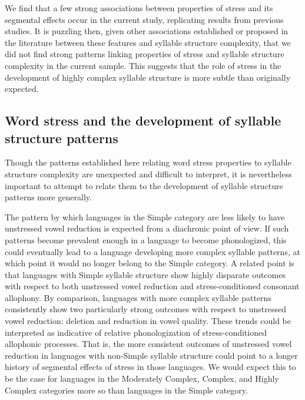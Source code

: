   We find that a few strong associations between properties of stress and its segmental effects occur in the current study, replicating results from previous studies. It is puzzling then, given other associations established or proposed in the literature between these features and syllable structure complexity, that we did not find strong patterns linking properties of stress and syllable structure complexity in the current sample. This suggests that the role of stress in the development of highly complex syllable structure is more subtle than originally expected.

\subsection{Word stress and the development of syllable structure patterns}\label{sec:5.5.2}

  Though the patterns established here relating word stress properties to syllable structure complexity are unexpected and difficult to interpret, it is nevertheless important to attempt to relate them to the development of syllable structure patterns more generally.

  The pattern by which languages in the Simple category are less likely to have unstressed vowel reduction is expected from a diachronic point of view. If such patterns become prevalent enough in a language to become phonologized, this could eventually lead to a language developing more complex syllable patterns, at which point it would no longer belong to the Simple category. A related point is that languages with Simple syllable structure show highly disparate outcomes with respect to both unstressed vowel reduction and stress-conditioned consonant allophony. By comparison, languages with more complex syllable patterns consistently show two particularly strong outcomes with respect to unstressed vowel reduction: deletion and reduction in vowel quality. These trends could be interpreted as indicative of relative phonologization of stress-conditioned allophonic processes. That is, the more consistent outcomes of unstressed vowel reduction in languages with non-Simple syllable structure could point to a longer history of segmental effects of stress in those languages. We would expect this to be the case for languages in the Moderately Complex, Complex, and Highly Complex categories more so than languages in the Simple category. 

